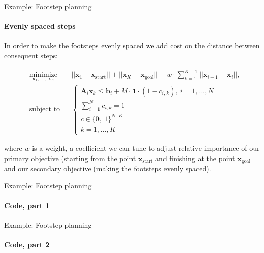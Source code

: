 \documentclass{beamer}
\begin{document}
\begin{frame}{Example: Footstep planning}
\framesubtitle{Evenly spaced steps}
\begin{flushleft}

In order to make the footsteps evenly spaced we add cost on the distance between consequent steps:

\begin{equation}
\begin{aligned}
& \underset{\mathbf{x}_1, \ ..., \ \mathbf{x}_K}{\text{minimize}}
& & ||\mathbf{x}_1 - \mathbf{x}_{\text{start}}|| + ||\mathbf{x}_K - \mathbf{x}_{\text{goal}}|| + w \cdot \sum_{k=1}^{K-1} ||\mathbf{x}_{i+1} - \mathbf{x}_i||, \\
& \text{subject to}
& & \begin{cases}
    \mathbf{A}_i \mathbf{x}_k \leq \mathbf{b}_i + M \cdot \mathbf{1} \cdot (1 - c_{i, k}), \ i = 1,...,N \\
    \sum_{i=1}^N c_{i, k} = 1 \\
    c  \in \{0, \ 1 \}^{N, \ K} \\
    k = 1,...,K
    \end{cases}
\end{aligned}
\end{equation}

where $w$ is a weight, a coefficient we can tune to adjust relative importance of our primary objective (starting from the point $\mathbf{x}_{\text{start}}$ and finishing at the point $\mathbf{x}_{\text{goal}}$ and our secondary objective (making the footsteps evenly spaced).  
 
\end{flushleft}
\end{frame}




\begin{frame}{Example: Footstep planning}
\framesubtitle{Code, part 1}
\begin{flushleft}


 
\end{flushleft}
\end{frame}


\begin{frame}{Example: Footstep planning}
\framesubtitle{Code, part 2}
\begin{flushleft}


 
\end{flushleft}
\end{frame}
\end{document}
